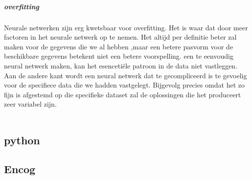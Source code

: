 \subparagraph{overfitting}
Neurale netwerken zijn erg kwetsbaar voor overfitting. Het is waar dat door meer factoren in het neurale netwerk op te nemen. Het altijd per definitie beter zal maken voor de gegevens die we al hebben ,maar een betere pasvorm voor de beschikbare gegevens betekent niet een betere voorspelling. een te eenvoudig neural netwerk maken, kan het esencetiële patroon in de data niet vastleggen. Aan de andere kant wordt een neural netwerk dat te gecompliceerd is te gevoelig voor de specifiece data die we hadden vastgelegt. Bijgevolg precies omdat het zo fijn is afgestemd op die specifieke dataset zal de oplossingen die het produceert zeer variabel zijn.\\\\


\subsection{python}

\subsection{Encog}